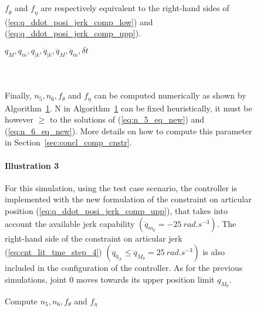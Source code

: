 \begin{figure}[!htbp]
$\textit{f}_{\theta}$ and $\textit{f}_{\eta}$ are respectively equivalent to the right-hand sides of (\ref{eq:q_ddot_posi_jerk_comp_low}) and (\ref{eq:q_ddot_posi_jerk_comp_upp}). \\
\noindent\begin{minipage}{\textwidth}
\renewcommand\footnoterule{}                  %
\begin{algorithm}[H]
\caption{Compute $n_{5}, n_{6}, f_{\theta}$ and $f_{\eta}$}
\label{alg:compute_f_theta_f_eta_n_5_n_6}
\begin{algorithmic}[1]
\Require $q_M, q_m, q_{|k}, \dot{q}_{|k},\dddot{q}_{M},\dddot{q}_{m}, \delta t$
 
 
        \EndIf   
        \EndIf            
\EndFor
{}
\myState {}\;
\end{algorithmic}
\end{algorithm}
\end{minipage} \\
\\
Finally, $n_{5}, n_{6}, f_{\theta}$ and $f_{\eta}$ can be computed numerically as shown by Algorithm~\ref{alg:compute_f_theta_f_eta_n_5_n_6}. 
N in Algorithm~\ref{alg:compute_f_theta_f_eta_n_5_n_6} can be fixed heuristically, it must be however $\geq$ to the solutions of (\ref{eq:n_5_eq_new}) and (\ref{eq:n_6_eq_new}). More details on how to compute this parameter in Section~\ref{sec:concl_comp_cnstr}.
\paragraph{Illustration 3}
For this simulation, using the test case scenario, the controller is implemented with the new formulation of the constraint on articular position  (\ref{eq:q_ddot_posi_jerk_comp_upp}), that takes into account the available jerk capability $(\dddot{q}_{m_{0}} = -25~rad.s^{-3})$. The right-hand side of the constraint on articular jerk (\ref{eq:cnt_lit_tme_step_4}) $(\dddot{q}_{{0}_{|k}} \leq \dddot{q}_{M_{0}} = 25~rad.s^{-3})$ is also included in the configuration of the controller. As for the previous simulations, joint $0$ moves towards its upper position limit $q_{M_{0}}$. 


\end{figure}
